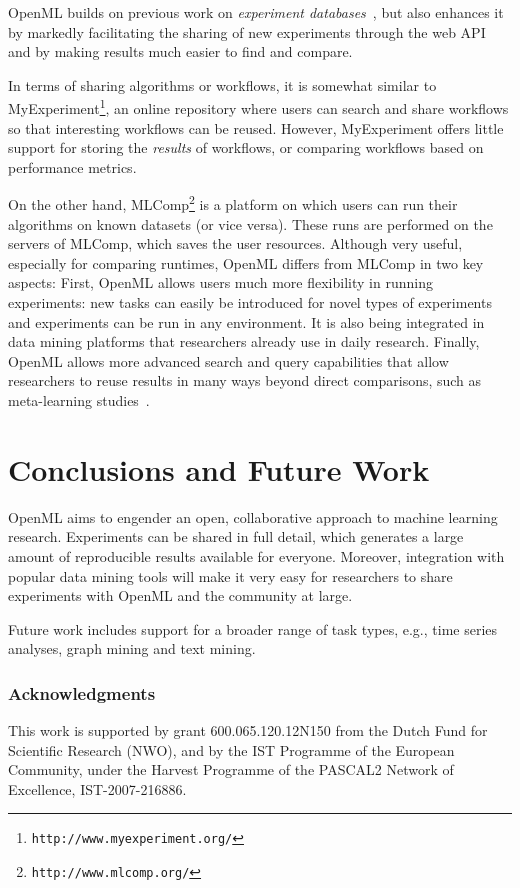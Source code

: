 \documentclass{llncs}
\begin{document}
OpenML builds on previous work on \emph{experiment databases}~\cite{Vanschoren2012}, but also enhances it by markedly facilitating the sharing of new experiments through the web API and by making results much easier to find and compare.

In terms of sharing algorithms or workflows, it is somewhat similar to MyExperiment\footnote{\texttt{http://www.myexperiment.org/}}, an online repository where users can search and share workflows so that interesting workflows can be reused. However, MyExperiment offers little support for storing the \emph{results} of workflows, or comparing workflows based on performance metrics.

On the other hand, MLComp\footnote{\texttt{http://www.mlcomp.org/}} is a platform on which  users can run their algorithms on known datasets (or vice versa). These runs are performed on the servers of MLComp, which saves the user resources. Although very useful, especially for comparing runtimes, OpenML differs from MLComp in two key aspects: First, OpenML allows users much more flexibility in running experiments: new tasks can easily be introduced for novel types of experiments and experiments can be run in any environment. It is also being integrated in data mining platforms that researchers already use in daily research. Finally, OpenML allows more advanced search and query capabilities that allow researchers to reuse results in many ways beyond direct comparisons, such as meta-learning studies~\cite{Vanschoren2012}.

\section{Conclusions and Future Work}
OpenML aims to engender an open, collaborative approach to machine learning research. Experiments can be shared in full detail, which generates a large amount of reproducible results available for everyone. Moreover, integration with popular data mining tools will make it very easy for researchers to share experiments with OpenML and the community at large.

Future work includes support for a broader range of task types, e.g., time series analyses, graph mining and text mining.

\subsubsection*{Acknowledgments}

This work is supported by grant 600.065.120.12N150 from the Dutch Fund for Scientific Research (NWO), and by the IST Programme of the European Community, under the Harvest Programme of the PASCAL2 Network of Excellence, IST-2007-216886.




%
%
\end{document}
